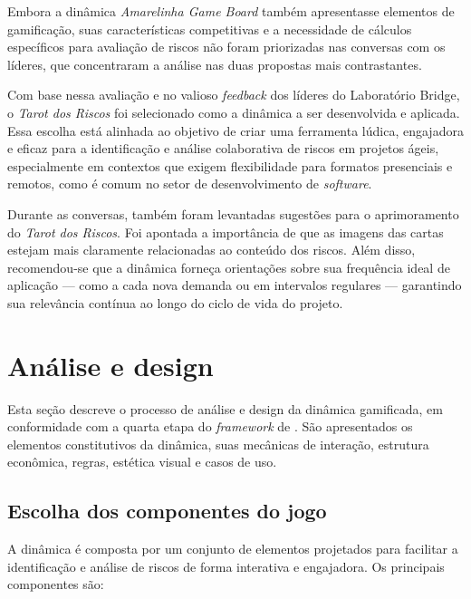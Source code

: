 \documentclass[
	12pt,
	openright,
	twoside,
	a4paper,
	english,
	brazil
	]{abntex2}
\begin{document}
Embora a dinâmica \textit{Amarelinha Game Board} também apresentasse elementos de gamificação, suas características competitivas e a necessidade de cálculos específicos para avaliação de riscos não foram priorizadas nas conversas com os líderes, que concentraram a análise nas duas propostas mais contrastantes.

Com base nessa avaliação e no valioso \textit{feedback} dos líderes do Laboratório Bridge, o \textit{Tarot dos Riscos} foi selecionado como a dinâmica a ser desenvolvida e aplicada. Essa escolha está alinhada ao objetivo de criar uma ferramenta lúdica, engajadora e eficaz para a identificação e análise colaborativa de riscos em projetos ágeis, especialmente em contextos que exigem flexibilidade para formatos presenciais e remotos, como é comum no setor de desenvolvimento de \textit{software}.

Durante as conversas, também foram levantadas sugestões para o aprimoramento do \textit{Tarot dos Riscos}. Foi apontada a importância de que as imagens das cartas estejam mais claramente relacionadas ao conteúdo dos riscos. Além disso, recomendou-se que a dinâmica forneça orientações sobre sua frequência ideal de aplicação — como a cada nova demanda ou em intervalos regulares — garantindo sua relevância contínua ao longo do ciclo de vida do projeto.

\section{Análise e design}
\label{sec:analise-design}

Esta seção descreve o processo de análise e design da dinâmica gamificada, em conformidade com a quarta etapa do \textit{framework} de . São apresentados os elementos constitutivos da dinâmica, suas mecânicas de interação, estrutura econômica, regras, estética visual e casos de uso. 

\subsection{Escolha dos componentes do jogo}
\label{sec:escolha-componentes}

A dinâmica é composta por um conjunto de elementos projetados para facilitar a identificação e análise de riscos de forma interativa e engajadora. Os principais componentes são:
\end{document}
